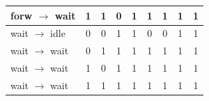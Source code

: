 \documentclass[
    paper=a4,
]{scrartcl}
\newcommand{\edit}[1]{\textcolor{colorred}{#1}}
\begin{document}
\begin{table}
\begin{tabular}{l|cccc|cccc}
            \edit{forw} $\rightarrow$ wait          &   1       &   1       &   0       &   1       &   \edit{1}        &   \edit{1}        &     1       &   1\\\midrule
            wait $\rightarrow$ idle                 &   0       &   0       &   1       &   1       &   \edit{0}        &   \edit{0}        &     1       &   1\\
            wait $\rightarrow$ wait                 &   0       &   1       &   1       &   1       &   \edit{1}        &   \edit{1}        &     1       &   1\\
            wait $\rightarrow$ wait                 &   1       &   0       &   1       &   1       &   \edit{1}        &   \edit{1}        &     1       &   1\\
            wait $\rightarrow$ wait                 &   1       &   1       &   1       &   1       &   \edit{1}        &   \edit{1}        &     1       &   1\\
            \bottomrule
        \end{tabular}
    \end{table}
\end{document}
